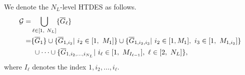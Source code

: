 \documentclass{article}
\newcommand{\tick}{{\sf tick}}
\begin{document}
%
%
%
%
%
%
%
We denote the $N_L$-level HTDES as follows. 
%
\begin{align}\label{htdes}
\mathcal{G}
=&\bigcup_{\ell\in[1,~N_L]}\{\overline{G}_\ell\}\notag \\
=&\{\overline{G}_1\}\cup\{\overline{G}_{1,i_{2}}|~i_2\in[1,~M_1]\}\cup\{\overline{G}_{1,i_{2},i_{3}}|~i_2\in[1,M_1],~i_3\in[1,~M_{1,i_2}]\}\notag \\
&~\cup\cdots\cup\{\overline{G}_{1,i_2,\ldots,i_{N_L}}|~i_\ell\in[1,~M_{I_{\ell-1}}],~ \ell\in[2,~N_L] \},
\end{align}
where $I_\ell$ denotes the index  $1,i_2,\ldots,i_{\ell}$.
%
%
\end{document}
